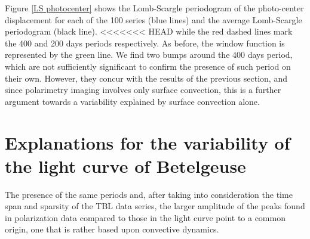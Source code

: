 \documentclass{aa}
\begin{document}
Figure \ref{LS photocenter} shows the Lomb-Scargle periodogram of the photo-center displacement for each of the 100 series (blue lines) and the average Lomb-Scargle periodogram (black line). 
<<<<<<< HEAD
while the red dashed lines mark the 400 and 
200 days periods respectively. As before, the window function is represented by the green line. We find two bumps around the 400 days period, which are not 
sufficiently significant to confirm the presence of such period on their own. However, they concur with the results of the previous section, 
and since polarimetry imaging involves only surface convection, this is a further argument towards a variability explained by surface convection alone. 

\section{Explanations for the variability of the light curve of Betelgeuse}
\label{section 3}
The presence of the same 
periods and, after taking into consideration the time span and sparsity of the TBL data series, the larger amplitude of the peaks found in
polarization data  compared to those  in the light curve point to a common origin, one that is rather based upon convective dynamics. 
\end{document}
